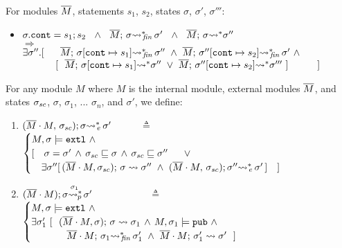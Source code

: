 {\begin{auxLemma}
\end{auxLemma} 

\begin{auxLemma}
\label{lemma:subexp}
For modules $\Mtwo$, statements $s_1$, $s_2$,  states $\sigma$, $\sigma'$, $\sigma'''$:
\begin{itemize}
\item
$ \sigma.\texttt{cont} = s_1; s_2 \ \ \wedge\ \  \leadstoBoundedStarFin {\Mtwo}  {\sigma}  {\sigma'}\ \ 
\wedge \ \
\leadstoBoundedStar {\Mtwo}  {\sigma}  {\sigma''}\
$\\
$  \Longrightarrow$\\
$   \exists \sigma''.[\ \ \ \ \   \leadstoBoundedStarFin {\Mtwo} {\sigma[\texttt{cont}\mapsto s_1]}  {\sigma''}  
\ \wedge\ 
\leadstoBoundedStarFin {\Mtwo} {\sigma''[\texttt{cont}\mapsto s_2]}   {\sigma'} \  \wedge$
\\
$\strut \hspace{1.2cm}  [ \ \ \leadstoBoundedStar {\Mtwo} {\sigma[\texttt{cont}\mapsto s_1]}   {\sigma''}\ \vee \ \leadstoBoundedStar {\Mtwo}  {\sigma''[\texttt{cont}\mapsto s_2]}   {\sigma'''}\ ]\ \ \ \ \ \ \ \  \ ] $
\end{itemize}
\end{auxLemma}

\begin{definition}
\label{def:exec:sum}
For any module $M$  where $M$ is the internal module, external modules $\Mtwo$, and states $\sigma\bd$,  $\sigma$,  $\sigma_1$, ... $\sigma_n$, and $\sigma'$, we define:

\begin{enumerate}

\item
 ${\leadstoBoundedThreeStarExt {\Mtwo\cdot M} {\sigma\bd}  {\sigma}  {\sigma'}}$ \ \ \ \ \   $\triangleq$ \ \ 
$
\begin{cases}
M, \sigma  \models  \extThis\  \wedge\  \\
[ \ \ \ 
\sigma=\sigma' \, \wedge\,  \EarlierS  {\sigma\bd}  {\sigma} \, \wedge\,  \EarlierS  {\sigma\bd}  {\sigma''}\ \ \ \ \ \vee\\
\ \ \ \exists \sigma''[\,  \leadstoBoundedThree {\Mtwo\cdot M} {\sigma}  {\sigma\bd}   {\sigma''} \  \wedge\  
{\leadstoBoundedThreeStarExt {\Mtwo\cdot M} {\sigma\bd}  {\sigma''}  {\sigma'}}\, ] \ \ \ ]
\end{cases}
$

\item
${\WithPub {\Mtwo\cdot M}    {\sigma}  {\sigma'} {\sigma_1}}$ \  \ \  \ \ \ \ \ \ \ \ $\triangleq$ \ \ 
$\begin{cases}
M, \sigma  \models \extThis \ \wedge \\
\exists   \sigma_1'\ [ \ \   \leadstoBoundedThree  {\Mtwo\cdot M} {\sigma} {\sigma}  {\sigma_{1}}\, \wedge\,  M, \sigma_1 \models \pubMeth \ \wedge \\ 
\strut \ \ \ \ \  \ \ \ \ \ \   \leadstoBoundedStarFin {\Mtwo\cdot M} {\sigma_1}  {\sigma_1'}  \ \wedge \   \leadstoBounded  {\Mtwo\cdot M} {\sigma_1'}      {\sigma'} \ \ ] 
\end{cases}
$


\end{enumerate}
\end{definition}}
